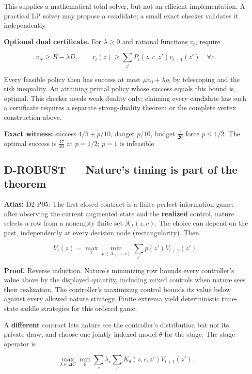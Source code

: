 \documentclass[
  11pt,
  a4paper,
]{article}
\begin{document}
This supplies a mathematical total solver, but not an efficient
implementation. A practical LP solver may propose a candidate; a small
exact checker validates it independently.

\textbf{Optional dual certificate.} For \(\lambda\ge0\) and rational
functions \(v_t\), require

\[v_N\ge R-\lambda D,\qquad
v_t(z)\ge\sum_{z'}P_t(z,c,z')v_{t+1}(z')\quad\forall c.\]

Every feasible policy then has success at most \(\mu v_0+\lambda\rho\),
by telescoping and the risk inequality. An attaining primal policy whose
success equals this bound is optimal. This checker needs weak duality
only; claiming every candidate has such a certificate requires a
separate strong-duality theorem or the complete vertex construction
above.

\textbf{Exact witness:} success \(4/5+p/10\), danger \(p/10\), budget
\(\frac{1}{20}\) force \(p\le1/2\). The optimal success is
\(\frac{17}{20}\) at \(p=1/2\); \(p=1\) is infeasible.

\subsection{D-ROBUST --- Nature's timing is part of the
theorem}\label{d-robust-natures-timing-is-part-of-the-theorem}

\textbf{Atlas:} D2-P05. The first closed contract is a finite
perfect-information game: after observing the current augmented state
and the \textbf{realized} control, nature selects a row from a nonempty
finite set \(\mathcal K_t(z,c)\). The choice can depend on the past,
independently at every decision node (rectangularity). Then

\[V_t(z)=\max_c\min_{p\in\mathcal K_t(z,c)}\sum_{z'}p(z')V_{t+1}(z').\]

\textbf{Proof.} Reverse induction. Nature's minimizing row bounds every
controller's value above by the displayed quantity, including mixed
controls when nature sees their realization. The controller's maximizing
control bounds its value below against every allowed nature strategy.
Finite extrema yield deterministic time-state saddle strategies for this
ordered game.

A \textbf{different} contract lets nature see the controller's
distribution but not its private draw, and choose one jointly indexed
model \(\theta\) for the stage. The stage operator is

\[\max_{\lambda\in\Delta C}\min_\theta\sum_c\lambda_c
 \sum_{z'}K_\theta(z,c,z')V_{t+1}(z').\]
\end{document}
